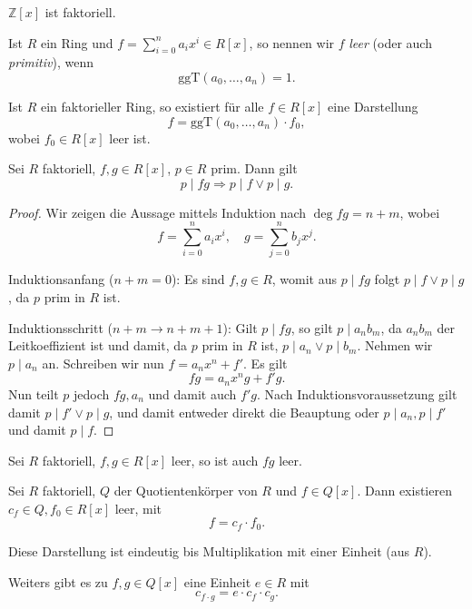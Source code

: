 \begin{corollary}
    $\mathbb{Z}[x]$ ist faktoriell.
\end{corollary}

\begin{definition}
    Ist $R$ ein Ring und $f = \sum_{i=0}^n a_i x^i \in R[x]$, so nennen wir $f$ \emph{leer} (oder auch \emph{primitiv}), wenn
    $$ \mathrm{ggT}( a_0, \hdots, a_n ) = 1. $$
\end{definition}

\begin{remark}
    Ist $R$ ein faktorieller Ring, so existiert für alle $f \in R[x]$ eine Darstellung
    $$ f = \mathrm{ggT}(a_0, \hdots, a_n) \cdot f_0, $$
    wobei $f_0 \in R[x]$ leer ist.
\end{remark}

\begin{lemma}
    Sei $R$ faktoriell, $f, g \in R[x]$, $p \in R$ prim. Dann gilt
    $$ p \mid f g \Rightarrow p \mid f \lor p \mid g. $$
\end{lemma}

\begin{proof}
    Wir zeigen die Aussage mittels Induktion nach $\deg fg = n+m$, wobei
    $$ f = \sum_{i=0}^n a_i x^i,\quad g = \sum_{j=0}^n b_j x^j. $$

    Induktionsanfang ($n+m=0$): Es sind $f, g \in R$, womit aus $p \mid fg$ folgt $p \mid f \lor p \mid g$, da $p$ prim in $R$ ist.

    Induktionsschritt ($n+m \to n+m+1$): Gilt $p \mid fg$, so gilt $p \mid a_n b_m$, da $a_n b_m$ der Leitkoeffizient ist und damit, da $p$ prim in $R$ ist, $p \mid a_n \lor p \mid b_m$. Nehmen wir \obda $p \mid a_n$ an. Schreiben wir nun $f = a_n x^n + f'$. Es gilt
    $$ fg = a_n x^n g + f' g. $$
    Nun teilt $p$ jedoch $fg, a_n$ und damit auch $f' g$. Nach Induktionsvoraussetzung gilt damit $p \mid f' \lor p \mid g$, und damit entweder direkt die Beauptung oder $p \mid a_n, p \mid f'$ und damit $p \mid f$.
\end{proof}

\begin{corollary}
    Sei $R$ faktoriell, $f,g \in R[x]$ leer, so ist auch $fg$ leer.
\end{corollary}

\begin{lemma}
    Sei $R$ faktoriell, $Q$ der Quotientenkörper von $R$ und $f \in Q[x]$. Dann existieren $c_f \in Q, f_0 \in R[x]$ leer, mit
    $$ f = c_f \cdot f_0. $$

    Diese Darstellung ist eindeutig bis Multiplikation mit einer Einheit (aus $R$).

    Weiters gibt es zu $f, g \in Q[x]$ eine Einheit $e \in R$ mit
    $$ c_{f \cdot g} = e \cdot c_f \cdot c_g. $$
\end{lemma}

